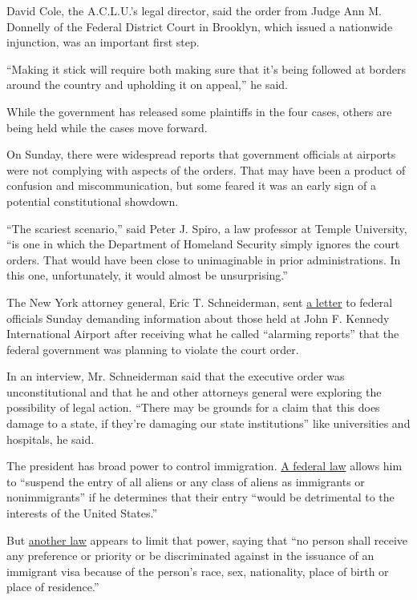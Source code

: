 David Cole, the A.C.L.U.'s legal director, said the order from Judge Ann
M. Donnelly of the Federal District Court in Brooklyn, which issued a
nationwide injunction, was an important first step.

``Making it stick will require both making sure that it's being followed
at borders around the country and upholding it on appeal,'' he said.

While the government has released some plaintiffs in the four cases,
others are being held while the cases move forward.

On Sunday, there were widespread reports that government officials at
airports were not complying with aspects of the orders. That may have
been a product of confusion and miscommunication, but some feared it was
an early sign of a potential constitutional showdown.

``The scariest scenario,'' said Peter J. Spiro, a law professor at
Temple University, ``is one in which the Department of Homeland Security
simply ignores the court orders. That would have been close to
unimaginable in prior administrations. In this one, unfortunately, it
would almost be unsurprising.''

The New York attorney general, Eric T. Schneiderman, sent
\href{https://ag.ny.gov/sites/default/files/dhs_cpb_letter_01_29_2016_final_rev_1.pdf}{a
letter} to federal officials Sunday demanding information about those
held at John F. Kennedy International Airport after receiving what he
called ``alarming reports'' that the federal government was planning to
violate the court order.

In an interview, Mr. Schneiderman said that the executive order was
unconstitutional and that he and other attorneys general were exploring
the possibility of legal action. ``There may be grounds for a claim that
this does damage to a state, if they're damaging our state
institutions'' like universities and hospitals, he said.

The president has broad power to control immigration.
\href{https://www.law.cornell.edu/uscode/text/8/1182}{A federal law}
allows him to ``suspend the entry of all aliens or any class of aliens
as immigrants or nonimmigrants'' if he determines that their entry
``would be detrimental to the interests of the United States.''

But \href{https://www.law.cornell.edu/uscode/text/8/1152}{another law}
appears to limit that power, saying that ``no person shall receive any
preference or priority or be discriminated against in the issuance of an
immigrant visa because of the person's race, sex, nationality, place of
birth or place of residence.''

